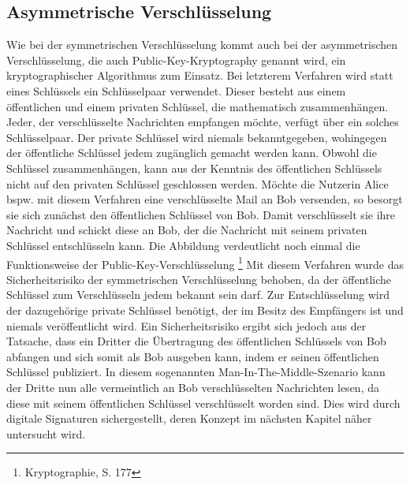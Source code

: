 \documentclass  [paper=a4,
				fontsize=12pt,
				listof=totoc,
				bibliography=totoc
				]{scrreprt}
\begin{document}
			\subsection{Asymmetrische Verschlüsselung}
				Wie bei der symmetrischen Verschlüsselung kommt auch bei der asymmetrischen Verschlüsselung, die auch Public-Key-Kryptography genannt wird, ein kryptographischer Algorithmus zum Einsatz. Bei letzterem Verfahren wird statt eines Schlüssels ein Schlüsselpaar verwendet. Dieser besteht aus einem öffentlichen und einem privaten Schlüssel, die mathematisch zusammenhängen. Jeder, der verschlüsselte Nachrichten empfangen möchte, verfügt über ein solches Schlüsselpaar. Der private Schlüssel wird niemals bekanntgegeben, wohingegen der öffentliche Schlüssel jedem zugänglich gemacht werden kann. Obwohl die Schlüssel zusammenhängen, kann aus der Kenntnis des öffentlichen Schlüssels nicht auf den privaten Schlüssel geschlossen werden. Möchte die Nutzerin Alice bspw. mit diesem Verfahren eine verschlüsselte Mail an Bob versenden, so besorgt sie sich zunächst den öffentlichen Schlüssel von Bob. Damit verschlüsselt sie ihre Nachricht und schickt diese an Bob, der die Nachricht mit seinem privaten Schlüssel entschlüsseln kann. Die Abbildung verdeutlicht noch einmal die Funktionsweise der Public-Key-Verschlüsselung
				\footnote{Kryptographie, S. 177}
				Mit diesem Verfahren wurde das Sicherheitsrisiko der symmetrischen Verschlüsselung behoben, da der öffentliche Schlüssel zum Verschlüsseln jedem bekannt sein darf. Zur Entschlüsselung wird der dazugehörige private Schlüssel benötigt, der im Besitz des Empfängers ist und niemals veröffentlicht wird.
				Ein Sicherheitsrisiko ergibt sich jedoch aus der Tatsache, dass ein Dritter die Übertragung des öffentlichen Schlüssels von Bob abfangen und sich somit als Bob ausgeben kann, indem er seinen öffentlichen Schlüssel publiziert. In diesem sogenannten Man-In-The-Middle-Szenario kann der Dritte nun alle vermeintlich an Bob verschlüsselten Nachrichten lesen, da diese mit seinem öffentlichen Schlüssel verschlüsselt worden sind.
				Dies wird durch digitale Signaturen sichergestellt, deren Konzept im nächsten Kapitel näher untersucht wird.
\end{document}
